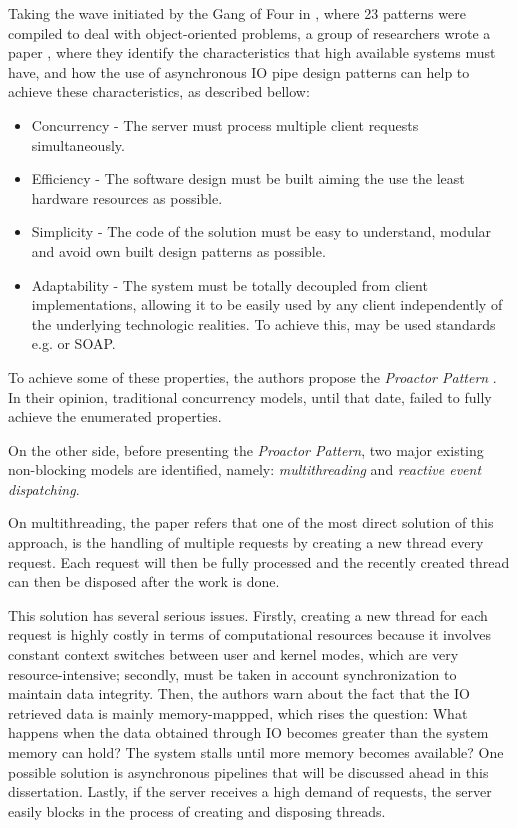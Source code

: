 Taking the wave initiated by the Gang of Four in \citep{gof}, where 23 patterns were compiled to deal with object-oriented problems, a group of researchers wrote a paper \citep{proactor}, where they identify the characteristics that high available systems must have, and how the use of asynchronous IO pipe design patterns can help to achieve these characteristics, as described bellow:
\begin{itemize}
	\item Concurrency - The server must process multiple client requests simultaneously.\\
	\item Efficiency - The software design must be built aiming the use the least hardware resources as possible. \\
	\item Simplicity - The code of the solution must be easy to understand, modular and avoid own built design patterns as possible. \\
    \item Adaptability - The system must be totally decoupled from client implementations, allowing it to be easily used by any client independently of the underlying technologic realities. To achieve this, may be used standards e.g. \cite{REST} or SOAP.\\
\end{itemize}

To achieve some of these properties, the authors propose the \textit{Proactor Pattern} \citep{proactor}. In their opinion, traditional concurrency models, until that date, failed to fully achieve the enumerated properties.

On the other side, before presenting the \textit{Proactor Pattern}, two major existing non-blocking models are identified, namely: \textit{multithreading} and \textit{reactive event dispatching}. 

On multithreading, the paper refers that one of the most direct solution of this approach, is the handling of multiple requests by creating a new thread every request. Each request will then be fully processed and the recently created thread can then be disposed after the work is done. 

This solution has several serious issues. Firstly, creating a new thread for each request is highly costly in terms of computational resources because it involves constant context switches between user and kernel modes, which are very resource-intensive; secondly, must be taken in account synchronization to maintain data integrity.
Then, the authors warn about the fact that the IO retrieved data is mainly memory-mappped, which rises the question: What happens when the data obtained through IO becomes greater than the system memory can hold? The system stalls until more memory becomes available? One possible solution is asynchronous pipelines that will be discussed ahead in this dissertation.
Lastly, if the server receives a high demand of requests, the server easily blocks in the process of creating and disposing threads. 

